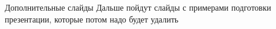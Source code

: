 \documentclass[aspectratio=169, 11pt]{beamer} %
\institute[\university]{\university \\ \faculty}
\title[\docname]{\docname}
\author[\tutorname]{\small Преподаватель: \tutorname}
\date{\the\year}
\begin{document}


\begin{frame}{Дополнительные слайды}
Дальше пойдут слайды с примерами подготовки презентации, которые потом надо будет удалить 
\end{frame}





\end{document}

